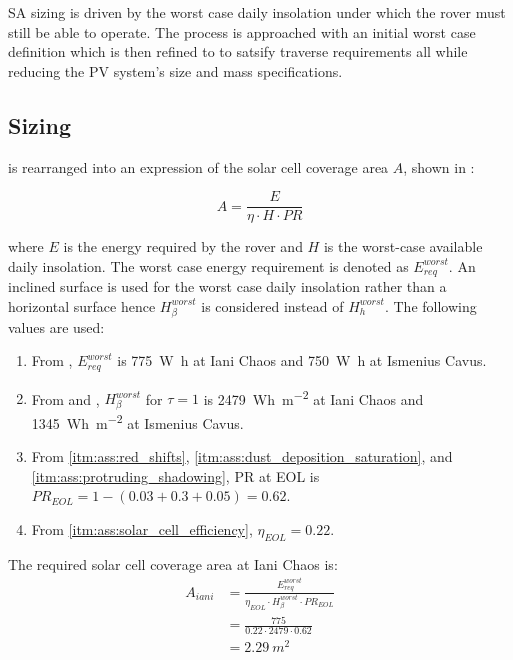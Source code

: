 \ac{SA} sizing is driven by the worst case daily insolation under which the rover must still be able to operate. The process is approached with an initial worst case definition which is then refined to to satsify traverse requirements all while reducing the \ac{PV} system's size and mass specifications.

\subsection{Sizing}
 is rearranged into an expression of the solar cell coverage area $A$, shown in :

\begin{equation}
  \label{eq:solar_cell_coverage_area}
  A = \frac{E}{\eta \cdot H \cdot PR}
\end{equation}

where $E$ is the energy required by the rover and $H$ is the worst-case available daily insolation. The worst case energy requirement is denoted as $E_{req}^{worst}$. An inclined surface is used for the worst case daily insolation rather than a horizontal surface hence $H_{\beta}^{worst}$ is considered instead of $H_{h}^{worst}$. The following values are used:

\begin{enumerate}[label=\textcolor{BulletBlue}{(\alph*)}]
    \item From , $E_{req}^{worst}$ is \SI{775}{\watt\hour} at Iani Chaos and \SI{750}{\watt\hour} at Ismenius Cavus.
    \item From  and , $H_{\beta}^{worst}$ for $\tau=1$ is \SI{2479}{Wh.m^{-2}} at Iani Chaos and \SI{1345}{Wh.m^{-2}} at Ismenius Cavus.
    \item From \ref{itm:ass:red_shifts}, \ref{itm:ass:dust_deposition_saturation}, and \ref{itm:ass:protruding_shadowing}, \ac{PR} at \ac{EOL} is $PR_{EOL} = 1 - (0.03 + 0.3 + 0.05) = 0.62$.
    \item From \ref{itm:ass:solar_cell_efficiency}, $\eta_{EOL} = 0.22$.
\end{enumerate}


The required solar cell coverage area at Iani Chaos is:
\begin{align}
  \label{calc:solar_cell_area_iani_chaos_traverse}
  A_{iani} &= \frac{E_{req}^{worst}}{\eta_{EOL} \cdot H_{\beta}^{worst} \cdot PR_{EOL}}\\
           &= \frac{775}{0.22 \cdot 2479 \cdot 0.62}\\
           &= \SI{2.29}{m^{2}}
\end{align}


